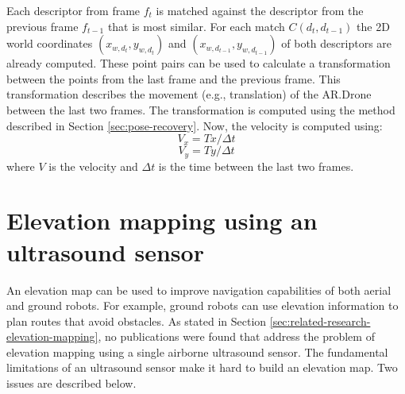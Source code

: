Each descriptor from frame $f_t$ is matched against the descriptor from the previous frame $f_{t-1}$ that is most similar.
For each match $C(d_t, d_{t-1})$ the 2D world coordinates $(x_{w, d_t}, y_{w, d_t})$ and $(x_{w, d_{t-1}}, y_{w, d_{t-1}})$ of both descriptors are already computed.
These point pairs can be used to calculate a transformation between the points from the last frame and the previous frame.
This transformation describes the movement (e.g., translation) of the AR.Drone between the last two frames.
The transformation is computed using the method described in Section \ref{sec:pose-recovery}.
Now, the velocity is computed using:
\begin{equation}
V_x = Tx / \Delta t
\end{equation}
\begin{equation}
V_y = Ty / \Delta t
\end{equation}
where $V$ is the velocity and $\Delta t$ is the time between the last two frames.



	\section{Elevation mapping using an ultrasound sensor}
	\label{sec:elevation_map}
An elevation map can be used to improve navigation capabilities of both aerial and ground robots.
For example, ground robots can use elevation information to plan routes that avoid obstacles.
As stated in Section \ref{sec:related-research-elevation-mapping}, no publications were found that address the problem of elevation mapping using a single airborne ultrasound sensor.
The fundamental limitations of an ultrasound sensor make it hard to build an elevation map.
Two issues are described below.

